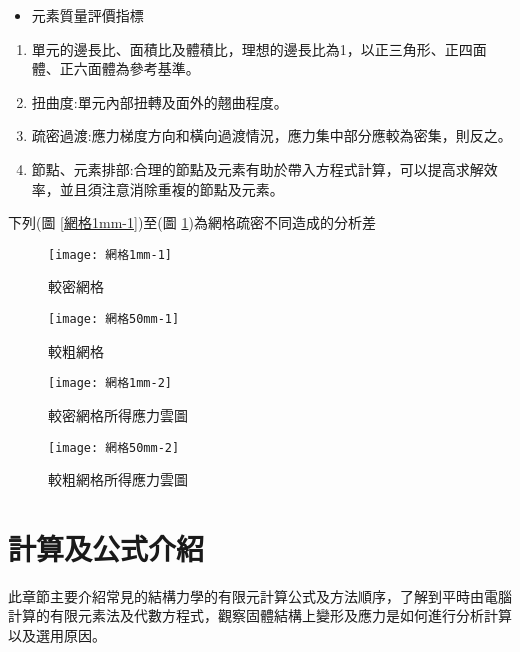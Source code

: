 \begin{itemize}
\item 元素質量評價指標
\end{itemize}

\begin{enumerate}
\item 單元的邊長比、面積比及體積比，理想的邊長比為1，以正三角形、正四面體、正六面體為參考基準。
\item 扭曲度:單元內部扭轉及面外的翹曲程度。
\item 疏密過渡:應力梯度方向和橫向過渡情況，應力集中部分應較為密集，則反之。
\item 節點、元素排部:合理的節點及元素有助於帶入方程式計算，可以提高求解效率，並且須注意消除重複的節點及元素。
\end{enumerate}
下列(圖 \ref{網格1mm-1})至(圖 \ref{網格50mm-2})為網格疏密不同造成的分析差\

\begin{figure}[htbp]
  \centering
  \begin{minipage}{0.4\textwidth}
    \centering
    \texttt{[image: 網格1mm-1]}
    \caption{較密網格}
    \label{網格1mm-1}
  \end{minipage}
  \hfill
  \begin{minipage}{0.4\textwidth}
    \centering
    \texttt{[image: 網格50mm-1]}
    \caption{較粗網格}
    \label{網格1mm-2}
  \end{minipage}
  
  \begin{minipage}{0.4\textwidth}
    \centering
    \texttt{[image: 網格1mm-2]}
    \caption{較密網格所得應力雲圖}
    \label{網格50mm-1}
  \end{minipage}
  \hfill
  \begin{minipage}{0.4\textwidth}
    \centering
    \texttt{[image: 網格50mm-2]}
    \caption{較粗網格所得應力雲圖}
    \label{網格50mm-2}
  \end{minipage}
\end{figure}
\newpage

\section{計算及公式介紹}
此章節主要介紹常見的結構力學的有限元計算公式及方法順序，了解到平時由電腦計算的有限元素法及代數方程式，觀察固體結構上變形及應力是如何進行分析計算以及選用原因。\\


